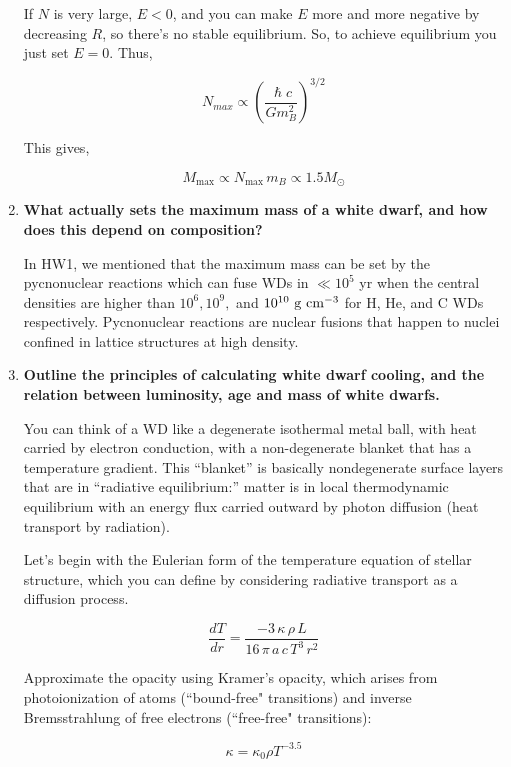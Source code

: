 \documentclass[a4paper]{article}
\begin{document}
\begin{enumerate}
If $N$ is very large, $ E < 0 $, and you can make $E$ more and more negative by decreasing $R$, so there's no stable equilibrium. So, to achieve equilibrium you just set $ E = 0 $. Thus,

$$ N_{max} \propto \left( \frac{\hslash c}{G m_B^2} \right)^{3/2} $$

This gives,

$$ M_{\mathrm{max}} \propto N_{\mathrm{max}} \, m_B \propto 1.5 M_\odot $$

\item \textbf{What actually sets the maximum mass of a white dwarf, and how does this depend on composition?}

In HW1, we mentioned that the maximum mass can be set by the pycnonuclear reactions which can fuse WDs in $\ll 10^5 $ yr when the central densities are higher than $10^6, 10^9,$ and $10^{10} \ \rm g \ cm^{-3}$ for H, He, and C WDs respectively. Pycnonuclear reactions are nuclear fusions that happen to nuclei confined in lattice structures at high density.

\item \textbf{Outline the principles of calculating white dwarf cooling, and the relation between luminosity, age and mass of white dwarfs.}

You can think of a WD like a degenerate isothermal metal ball, with heat carried by electron conduction, with a non-degenerate blanket that has a temperature gradient. This ``blanket'' is basically nondegenerate surface layers that are in ``radiative equilibrium:'' matter is in local thermodynamic equilibrium with an energy flux carried outward by photon diffusion (heat transport by radiation). 

Let's begin with the Eulerian form of the temperature equation of stellar structure, which you can define by considering radiative transport as a diffusion process. 

\begin{equation}
\frac{dT}{dr} = \frac{-3 \, \kappa \, \rho \, L}{16 \, \pi \, a \, c \, T^3 \, r^2}
\end{equation}

Approximate the opacity using Kramer's opacity, which arises from photoionization of atoms (``bound-free" transitions) and inverse Bremsstrahlung of free electrons (``free-free" transitions):

\begin{equation}
\kappa = \kappa_0 \rho T^{-3.5}
\end{equation}


\end{enumerate}
\end{document}
